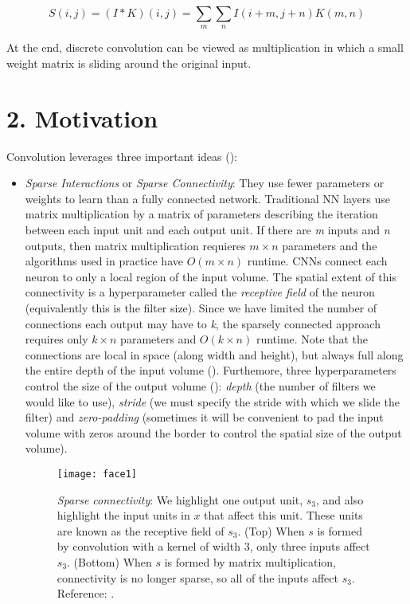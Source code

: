 \documentclass[12pt,a4paper,authoryear]{elsarticle}
\begin{document}
		\begin{equation}
		S(i,j) = (I*K)(i,j) = \sum_m\sum_nI(i+m,j+n)K(m,n)
		\end{equation}
		
		At the end, discrete convolution can be viewed as multiplication in which a small weight matrix is sliding around the original input. 
	
\section*{2.  Motivation}

	Convolution leverages three important ideas  (\cite{goodfellow2016deep}):
	
	\begin{itemize}
		\item \textit{Sparse Interactions} or \textit{Sparse Connectivity}: They use fewer parameters or weights to learn than a fully connected network. Traditional NN layers use matrix multiplication by a matrix of parameters describing the iteration between each input unit and each output unit. If there are \textit{m} inputs and \textit{n} outputs, then matrix multiplication requieres $m\times n$ parameters and the algorithms used in practice have $O(m\times n)$ runtime. CNNs connect each neuron to only a local region of the input volume. The spatial extent of this connectivity is a hyperparameter called the \textit{receptive field} of the neuron (equivalently this is the filter size). Since we have limited the number of connections each output may have to \textit{k}, the sparsely connected approach requires only $k\times n$ parameters and $O(k\times n)$ runtime. Note that the connections are local in space (along width and height), but always full along the entire depth of the input volume (\cite{cs231n}). Furthemore, three hyperparameters control the size of the output volume (\cite{cs231n}): \textit{depth} (the number of filters we would like to use), \textit{stride} (we must specify the stride with which we slide the filter) and \textit{zero-padding} (sometimes it will be convenient to pad the input volume with zeros around the border to control the spatial size of the output volume).
		
		\begin{figure}[]
			\begin{center}
				\texttt{[image: face1]}
				\caption{\textit{Sparse connectivity}: We highlight one output unit, $s_3$, and also highlight the input units in $x$ that affect this unit. These units are known as the receptive field of $s_3$. (Top) When $s$ is formed by convolution with a kernel of width 3, only three inputs affect $s_3$. (Bottom) When $s$ is formed by matrix multiplication, connectivity is no longer sparse, so all of the inputs affect $s_3$. Reference: \cite{goodfellow2016deep}.}
			\end{center}
		\end{figure}
		

\end{itemize}
\end{document}
